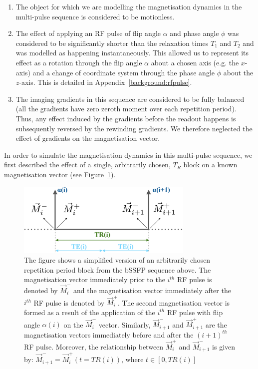 \begin{enumerate}
    \item The object for which we are modelling the magnetisation dynamics in the multi-pulse sequence is considered to be motionless.

    \item The effect of applying an RF pulse of flip angle $\alpha$ and phase angle $\phi$ was considered to be significantly shorter than the relaxation times $T_1$ and $T_2$ and was modelled as happening instantaneously.
    This allowed us to represent its effect as a rotation through the flip angle $\alpha$ about a chosen axis (e.g. the $x$-axis) and a change of coordinate system through the phase angle $\phi$ about the $z$-axis.
    This is detailed in Appendix~\ref{background:rfpulse}.
    
    \item The imaging gradients in this sequence are considered to be fully balanced (all the gradients have zero zeroth moment over each repetition period).
    Thus, any effect induced by the gradients before the readout happens is subsequently reversed by the rewinding gradients.
    We therefore neglected the effect of gradients on the magnetisation vector.

\end{enumerate}

In order to simulate the magnetisation dynamics in this multi-pulse sequence, we first described the effect of a single, arbitrarily chosen, $T_R$ block on a known magnetisation vector (see Figure~\ref{fig:sequencebSSFPOneBlock}).

\hfill

\begin{figure}[ht]
    \centering
    \includegraphics[angle=0,width=0.75\textwidth, keepaspectratio]{images/mrf/sequencebSSFPOneBlock}
    \caption{The figure shows a simplified version of an arbitrarily chosen repetition period block from the bSSFP sequence above.
    The magnetisation vector immediately prior to the $i^{th}$ RF pulse is denoted by $\vec{M}^-_i$ and the magnetisation vector immediately after the $i^{th}$ RF pulse is denoted by $\vec{M}^+_i$.
    The second magnetisation vector is formed as a result of the application of the $i^{th}$ RF pulse with flip angle $\alpha(i)$ on the $\vec{M}^-_i$ vector.
    Similarly, $\vec{M}^-_{i+1}$ and $\vec{M}^+_{i+1}$ are the magnetisation vectors immediately before and after the $(i+1)^{th}$ RF pulse.
    Moreover, the relationship between $\vec{M}^+_{i}$ and $\vec{M}^-_{i+1}$ is given by: $ \vec{M}^-_{i+1} = \vec{M}^+_{i}(t = TR(i))$, where $t \in [0, TR(i)]$ }
    \label{fig:sequencebSSFPOneBlock}
\end{figure}

